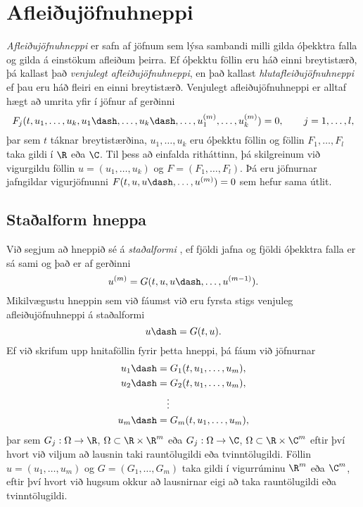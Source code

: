 \section{Afleiðujöfnuhneppi}\label{grein1.3}

\noindent
{\it Afleiðujöfnuhneppi} er safn af jöfnum sem
lýsa sambandi milli gilda
óþekktra falla og gilda á einstökum afleiðum þeirra.  Ef óþekktu föllin eru
háð einni breytistærð, þá kallast það {\it
venjulegt afleiðujöfnuhneppi},
en það kallast {\it
hlutafleiðujöfnuhneppi} ef þau eru háð fleiri en
einni breytistærð.  Venjulegt afleiðujöfnuhneppi er alltaf hægt að
umrita yfir í jöfnur af gerðinni
\begin{equation*}
F_j(t,u_1,\dots,u_k,u_1\dash,\dots,u_k\dash,\dots,
u_1^{(m)},\dots,u_k^{(m)})=0, \qquad j=1,\dots,l,
\label{1.3.1}
\end{equation*}
þar sem $t$ táknar breytistærðina, $u_1,\dots,u_k$ eru óþekktu föllin og
föllin $F_1,\dots,F_l$  taka gildi í $\R$ eða $\C$.  Til þess að einfalda
ritháttinn, þá skilgreinum við vigurgildu föllin $u=(u_1,\dots,u_k)$ og
$F=(F_1,\dots,F_l)$. Þá eru jöfnurnar jafngildar vigurjöfnunni
$F(t,u,u\dash,\dots,u^{(m)})=0$
sem hefur sama útlit.


\subsection*{Staðalform hneppa}

Við segjum að hneppið sé á {\it
staðalformi}
, ef fjöldi jafna og fjöldi
óþekktra falla er sá sami og það er af gerðinni
$$
u^{(m)}=G(t,u,u\dash,\dots,u^{(m-1)}).
$$
Mikilvægustu hneppin sem við fáumst við eru
fyrsta stigs venjuleg afleiðujöfnuhneppi á staðalformi
$$
u\dash =G(t,u).
$$
Ef við skrifum upp hnitaföllin fyrir þetta hneppi, þá  fáum við jöfnurnar
\begin{align*}
u_1\dash&= G_1(t, u_1,\dots, u_m),\\
u_2\dash&= G_2(t, u_1,\dots, u_m),\\
&\quad \vdots\\
u_m\dash&= G_m(t, u_1,\dots, u_m),
\end{align*}
þar sem $G_j:\Omega\to\R$,  $\Omega\subset \R\times\R^m$ eða
$G_j:\Omega\to\C$,  $\Omega\subset \R\times\C^m$ eftir því hvort við
viljum að lausnin taki rauntölugildi eða tvinntölugildi.
Föllin $u=(u_1,\dots,u_m)$ og $G=(G_1,\dots,G_m)$
taka gildi í vigurrúminu $\R\sp m$ eða $\C\sp m$, eftir því hvort við
hugsum okkur að lausnirnar eigi að taka rauntölugildi eða
tvinntölugildi.


